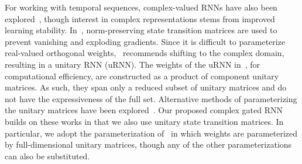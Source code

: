 \documentclass{article}
\begin{document}
For working with temporal sequences, complex-valued RNNs have also been explored~\cite{Arjovsky,Hyland,jing2016tunable,Wisdom}, though interest in complex representations stems from improved learning stability. In~\cite{Arjovsky}, norm-preserving state transition matrices are used to prevent vanishing and exploding gradients.  Since it is difficult to parameterize real-valued orthogonal weights,~\cite{Arjovsky} recommends shifting to the complex domain, resulting in a unitary RNN (uRNN). The weights of the uRNN in~\cite{Arjovsky}, for computational efficiency, are constructed as a product of component unitary matrices.  As such, they span only a reduced subset of unitary matrices and do not have the expressiveness of the full set.  Alternative methods of parameterizing the unitary matrices have been explored~\cite{Hyland,jing2016tunable,Wisdom}. Our proposed complex gated RNN builds on these works in that we also use unitary state transition matrices.  In particular, we adopt the parameterization of~\cite{Wisdom} in which weights are parameterized by full-dimensional unitary matrices, though any of the other parameterizations~\cite{Arjovsky,Hyland,jing2016tunable} can also be substituted.




\end{document}
